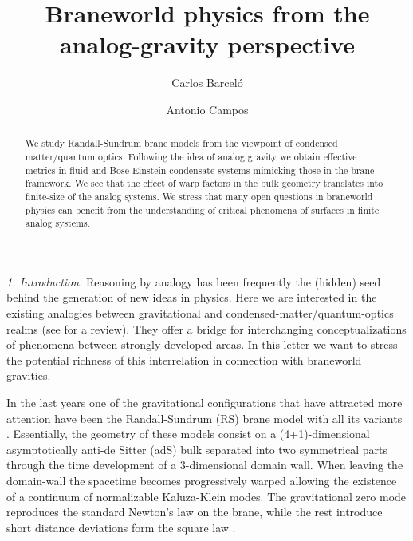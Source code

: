 \documentclass[a4paper,prl,showpacs,twocolumn]{revtex4}
\begin{document}
\def\Barcelo{Barcel\'o}
\def\Schrodinger{Schr\"odinger}
\title[Braneworld physics from ...\dots]{Braneworld physics from the 
analog-gravity perspective}
\author{Carlos \Barcelo}
\author{Antonio Campos}
\begin{abstract}

We study Randall-Sundrum brane models from the viewpoint of condensed 
matter/quantum optics. 
Following the idea of analog gravity we obtain effective
metrics in fluid and Bose-Einstein-condensate systems
mimicking those in the brane framework.
We see that the effect of warp factors in the bulk geometry translates
into finite-size of the analog systems.
We stress that many open questions in braneworld physics
can benefit from the understanding of critical phenomena of surfaces 
in finite analog systems.


\end{abstract}
\maketitle
\def\half{{1\over 2}}
\def\L{{\mathcal L}}
\def\S{{\mathcal S}}
\def\d{{\mathrm{d}}}
\def\x{{\mathbf x}}
\def\v{{\mathbf v}}
\def\im{{\rm i}}
\def\etal{{\emph{et al\/}}}
\def\det{{\mathrm{det}}}
\def\tr{{\mathrm{tr}}}
\def\ie{{\emph{i.e.}}}
\def\bnabla{\mbox{\boldmath\myHighlight{$\nabla$}\coordHE{}}}
\def\Box{\kern0.5pt{\lower0.1pt\vbox{\hrule height.5pt width 6.8pt
    \hbox{\vrule width.5pt height6pt \kern6pt \vrule width.3pt}
    \hrule height.3pt width 6.8pt} }\kern1.5pt}
\def\HRULE{{\bigskip\hrule\bigskip}}

\noindent
{\it 1. Introduction.}
Reasoning by analogy has been frequently the (hidden) seed 
behind the generation of new ideas in physics. 
Here we are interested in the existing 
analogies between gravitational and condensed-matter/quantum-optics realms
(see \cite{Workshop} for a review). They offer a bridge for interchanging 
conceptualizations of phenomena between strongly developed 
areas. In this letter we want to stress the potential
richness of this interrelation in connection with braneworld
gravities. 


In the last years one of the gravitational configurations
that have attracted more attention have been the Randall-Sundrum (RS)
brane model with all its variants \cite{RS1,RS2}.
Essentially, the geometry of these models consist on a (4+1)-dimensional
asymptotically anti-de Sitter (adS) bulk separated into two symmetrical
parts through the time development of a 3-dimensional domain wall.
When leaving the domain-wall the spacetime becomes progressively warped
allowing the existence of a continuum of normalizable Kaluza-Klein
modes. The gravitational zero mode reproduces the standard Newton's law
on the brane, while the rest introduce short distance deviations
form the square law \cite{RS2,garriga}.
\end{document}
